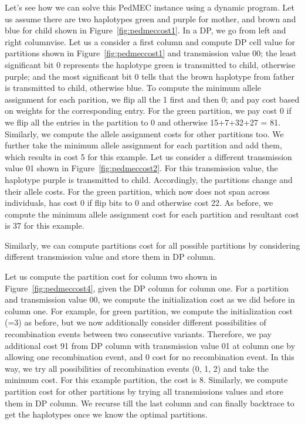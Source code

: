 Let's see how we can solve this PedMEC instance using a dynamic program. Let us assume there are two haplotypes green and purple for mother, and brown and blue for child shown in Figure~\ref{fig:pedmeccost1}.
In a DP, we go from left and right columnvise. Let us a consider a first column and compute DP cell value for partitions shown in Figure~\ref{fig:pedmeccost1} and transmission value 00; the least significant bit 0 represents the haplotype green is transmitted to child, otherwise purple; and the most significant bit 0 tells that the
brown haplotype from father is transmitted to child, otherwise blue. To compute the minimum allele assignment for each parition, we flip all the 1 first and then 0; and pay cost based on weights for the corresponding entry.
For the green partition, we pay cost 0 if we flip all the entries in the partition to 0 and otherwise 15+7+32+27 = 81.
Similarly, we compute the allele assignment costs for other partitions too.
We further take the minimum allele assignment for each partition and add them, which results in cost 5 for this example.
Let us consider a different transmission value 01 shown in Figure~\ref{fig:pedmeccost2}. For this transmission value, the haplotype purple is transmitted to child.
Accordingly, the partitions change and their allele costs. For the green partition, which now does not span across individuals, has cost 0 if flip bits to 0 and otherwise cost 22.
As before, we compute the minimum allele assignment cost for each partition and resultant cost is 37 for this example.

Similarly, we can compute partitions cost for all possible partitions by considering different transmission value and store them in DP column.

Let us compute the partition cost for column two shown in Figure~\ref{fig:pedmeccost4}, given the DP column for column one.
For a partition and transmission value 00, we compute the initialization cost as we did before in column one. 
For example, for green partition, we compute the initialization cost (=3) as before, but we now additionally consider different possibilities of recombination events between two consecutive variants.
Therefore, we pay additional cost 91 from DP column with transmission value 01 at column one by allowing one recombination event, and 0 cost for no recombination event.
In this way, we try all possibilities of recombination events (0, 1, 2) and take the minimum cost. For this example partition, the cost is 8.
Similarly, we compute partition cost for other partitions by trying all transmissions values and store them in DP column.
We recurse till the last column and can finally backtrace to get the haplotypes once we know the optimal partitions.

